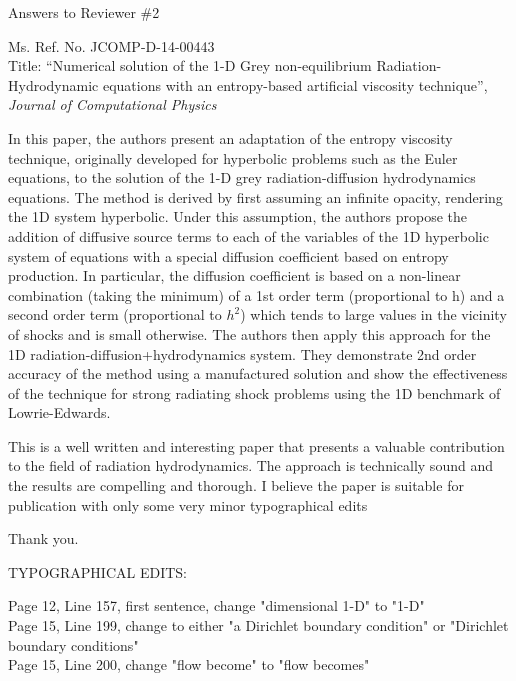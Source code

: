 \documentclass{article}
\begin{document}
\begin{center}
{ \Large Answers to Reviewer \#2}
\end{center}

\bigskip

\noindent Ms. Ref. No. JCOMP-D-14-00443\\
Title: ``Numerical solution of the 1-D Grey non-equilibrium Radiation-Hydrodynamic equations with an entropy-based artificial viscosity technique'', \\
{\it Journal of Computational Physics}\\

\bigskip
\bigskip

{
\color{blue}
In this paper, the authors present an adaptation of the entropy viscosity technique, originally developed for hyperbolic problems such as the Euler equations, to the solution of the 1-D grey radiation-diffusion hydrodynamics equations. The method is derived by first assuming an infinite opacity, rendering  the 1D system hyperbolic. Under this assumption, the authors propose the addition of diffusive source terms to each of the variables of the 1D hyperbolic system of equations with a special diffusion coefficient based on entropy production. In particular, the diffusion coefficient is based on a non-linear combination (taking the minimum) of a 1st order term (proportional to h)  and a second order term (proportional to $h^2$) which tends to large values in the vicinity of shocks and is small otherwise. The authors then apply this approach for the 1D radiation-diffusion+hydrodynamics system. They demonstrate 2nd order accuracy of the method using a manufactured solution and show the effectiveness of the technique for strong radiating shock problems using the 1D benchmark of Lowrie-Edwards.

This is a well written and interesting paper that presents a valuable contribution to the field of radiation hydrodynamics. The approach is technically sound and the results are compelling and thorough. I believe the paper is suitable for publication with only some very minor typographical edits
}

Thank you. 
\bigskip

{
\color{blue}
\noindent
TYPOGRAPHICAL EDITS:

Page 12, Line 157, first sentence, change "dimensional 1-D" to "1-D" \\
Page 15, Line 199, change to either "a Dirichlet boundary condition" or  "Dirichlet boundary conditions" \\
Page 15,  Line 200, change "flow become" to "flow becomes"}
\end{document}
